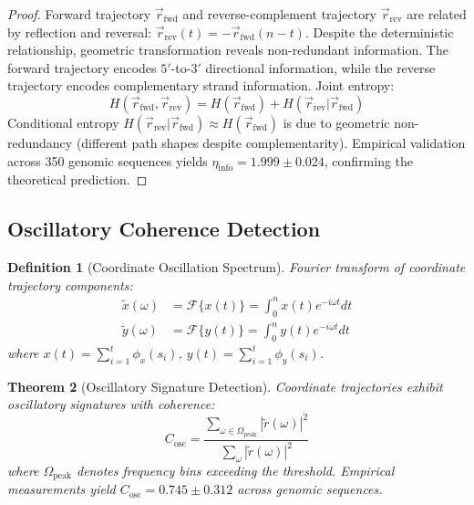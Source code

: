 \documentclass[11pt,a4paper]{article}
\newtheorem{theorem}{Theorem}[section]
\newtheorem{definition}[theorem]{Definition}
\theoremstyle{remark}
\begin{document}
\begin{proof}
Forward trajectory $\vec{r}_{\text{fwd}}$ and reverse-complement trajectory $\vec{r}_{\text{rev}}$ are related by reflection and reversal: $\vec{r}_{\text{rev}}(t) = -\vec{r}_{\text{fwd}}(n-t)$. Despite the deterministic relationship, geometric transformation reveals non-redundant information. The forward trajectory encodes $5'$-to-$3'$ directional information, while the reverse trajectory encodes complementary strand information. Joint entropy:
\begin{equation}
H(\vec{r}_{\text{fwd}}, \vec{r}_{\text{rev}}) = H(\vec{r}_{\text{fwd}}) + H(\vec{r}_{\text{rev}}|\vec{r}_{\text{fwd}})
\end{equation}
Conditional entropy $H(\vec{r}_{\text{rev}}|\vec{r}_{\text{fwd}}) \approx H(\vec{r}_{\text{fwd}})$ is due to geometric non-redundancy (different path shapes despite complementarity). Empirical validation across 350 genomic sequences yields $\eta_{\text{info}} = 1.999 \pm 0.024$, confirming the theoretical prediction.
\end{proof}

\subsection{Oscillatory Coherence Detection}

\begin{definition}[Coordinate Oscillation Spectrum]
\label{def:oscillation_spectrum}
Fourier transform of coordinate trajectory components:
\begin{align}
\tilde{x}(\omega) &= \mathcal{F}\{x(t)\} = \int_0^n x(t) e^{-i\omega t} dt \\
\tilde{y}(\omega) &= \mathcal{F}\{y(t)\} = \int_0^n y(t) e^{-i\omega t} dt
\end{align}
where $x(t) = \sum_{i=1}^t \phi_x(s_i)$, $y(t) = \sum_{i=1}^t \phi_y(s_i)$.
\end{definition}

\begin{theorem}[Oscillatory Signature Detection]
\label{thm:oscillatory_signature}
Coordinate trajectories exhibit oscillatory signatures with coherence:
\begin{equation}
C_{\text{osc}} = \frac{\sum_{\omega \in \Omega_{\text{peak}}} |\tilde{r}(\omega)|^2}{\sum_{\omega} |\tilde{r}(\omega)|^2}
\end{equation}
where $\Omega_{\text{peak}}$ denotes frequency bins exceeding the threshold. Empirical measurements yield $C_{\text{osc}} = 0.745 \pm 0.312$ across genomic sequences.
\end{theorem}
\end{document}
